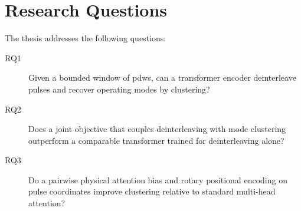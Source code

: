 \section{Research Questions}\label{sec:intro:rq}

The thesis addresses the following questions:
\begin{description}
  \item[RQ1] Given a bounded window of \glspl{pdw}, can a transformer encoder deinterleave pulses and recover operating modes by clustering?
  \item[RQ2] Does a joint objective that couples deinterleaving with mode clustering outperform a comparable transformer trained for deinterleaving alone?
  \item[RQ3] Do a pairwise physical attention bias and rotary positional encoding on pulse coordinates improve clustering relative to standard multi-head attention?
\end{description}
